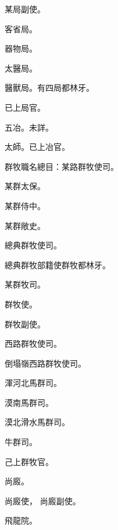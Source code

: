 \begin{pinyinscope}
 某局副使。



 客省局。



 器物局。



 太醫局。



 醫獸局。有四局都林牙。



 已上局官。



 五冶。未詳。



 太師。已上冶官。



 群牧職名總目：某路群牧使司。



 某群太保。



 某群侍中。



 某群敞史。



 總典群牧使司。



 總典群牧部籍使群牧都林牙。



 某群牧司。



 群牧使。



 群牧副使。



 西路群牧使司。



 倒塌嶺西路群牧使司。



 渾河北馬群司。



 漠南馬群司。



 漠北滑水馬群司。



 牛群司。



 己上群牧官。



 尚廄。



 尚廄使，
 尚廄副使。



 飛龍院。




\end{pinyinscope}
